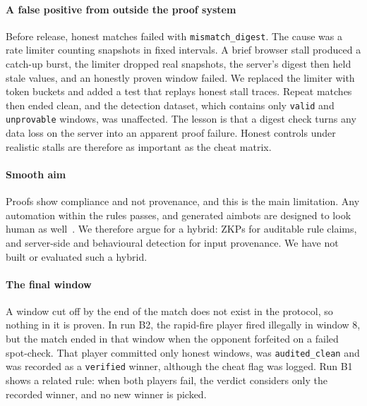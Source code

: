 \documentclass[conference]{IEEEtran}
\newcommand{\status}[1]{\texttt{#1}}
\begin{document}
\paragraph*{A false positive from outside the proof system}
Before release, honest matches failed with \status{mismatch\_digest}. %
The cause was a rate limiter counting snapshots in fixed intervals.
A brief browser stall produced a catch-up burst, the limiter dropped real snapshots, the server's digest then held stale values, and an honestly proven window failed. %
We replaced the limiter with token buckets and added a test that replays honest stall traces. %
Repeat matches then ended clean, and the detection dataset, which contains only \status{valid} and \status{unprovable} windows, was unaffected. %
The lesson is that a digest check turns any data loss on the server into an apparent proof failure.
Honest controls under realistic stalls are therefore as important as the cheat matrix.

\paragraph*{Smooth aim}
Proofs show compliance and not provenance, and this is the main limitation.
Any automation within the rules passes, and generated aimbots are designed to look human as well~\cite{kanervisto2023}.
We therefore argue for a hybrid: ZKPs for auditable rule claims, and server-side and behavioural detection for input provenance.
We have not built or evaluated such a hybrid.

\paragraph*{The final window}
A window cut off by the end of the match does not exist in the protocol, so nothing in it is proven.
In run B2, the rapid-fire player fired illegally in window 8, but the match ended in that window when the opponent forfeited on a failed spot-check. %
That player committed only honest windows, was \status{audited\_clean} and was recorded as a \status{verified} winner, although the cheat flag was logged. %
Run B1 shows a related rule: when both players fail, the verdict considers only the recorded winner, and no new winner is picked. %
\end{document}
